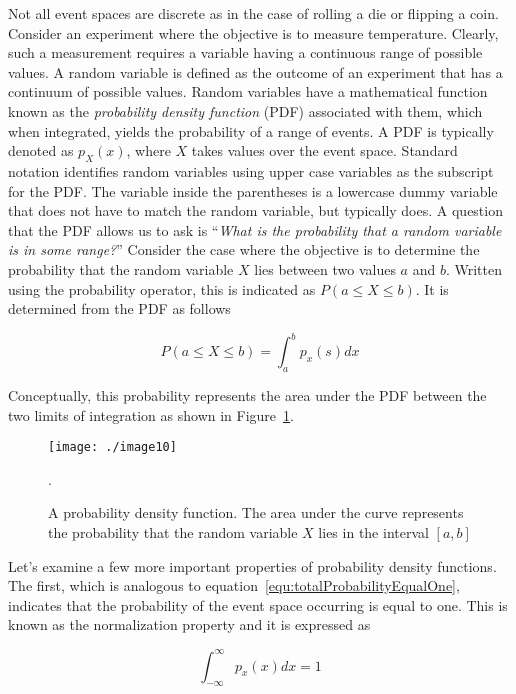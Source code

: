 {Not all event spaces are discrete as in the case of rolling a die or
flipping a coin. Consider an experiment where the objective is to
measure temperature. Clearly, such a measurement requires a variable
having a continuous range of possible values. A random variable is
defined as the outcome of an experiment that has a continuum of possible
values. Random variables have a mathematical function known as the
\emph{probability density function} (PDF) associated with them, which
when integrated, yields the probability of a range of events. A PDF is
typically denoted as $p_X(x)$, where
$X$ takes values over the event space. Standard notation identifies
random variables using upper case variables as the subscript for the
PDF. The variable inside the parentheses is a lowercase dummy variable
that does not have to match the random variable, but typically does. A
question that the PDF allows us to ask is ``\emph{What is the
probability that a random variable is in some range?}'' Consider the
case where the objective is to determine the probability that the random
variable $X$ lies between two values $a$ and $b$. Written
using the probability operator, this is indicated as
$P(a \leq X \leq b)$. It is determined from the PDF as
follows

\begin{equation}
\label{probabilityDensityFunction}
P(a \leq X \leq b) = \int^b_a p_x(s)dx
\end{equation}

Conceptually, this probability represents the area under the PDF between
the two limits of integration as shown in 
Figure~\ref{figure:probabilityDensityFunction}.

\begin{figure}
\texttt{[image: ./image10]}
\caption{ A probability density function. The area under the
curve represents the probability that the random variable $X$ lies
in the interval $[ a,b ]$}.
\label{figure:probabilityDensityFunction}
\end{figure}

Let's examine a few more important properties of probability density
functions. The first, which is analogous to
equation~\ref{equ:totalProbabilityEqualOne}, indicates that the
probability of the event space occurring is equal to one. This is known
as the normalization property and it is expressed as

\begin{equation}
\label{equ:integralPDFequals1}
\int^{\infty}_{-\infty} p_x(x)dx = 1
\end{equation}

}
